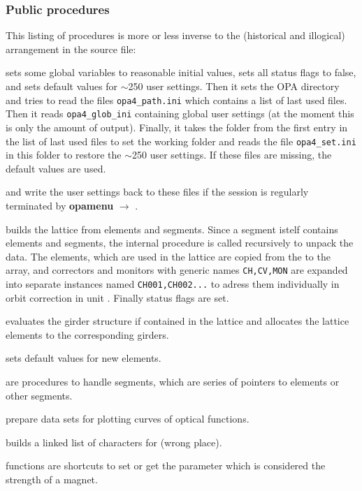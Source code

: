 \documentclass[12pt]{article}
\newcommand\code[1]{{\tt #1}}
\newcommand{\ofld}[1]{\colorbox{black!15}{{\bf #1}}}
\newcommand\guico[1]{{\color{blue}\code{#1}}}
\newcommand{\unico}[1]{{\color{burntorange}\code{#1}}}
\newcommand{\evcod}[2]{\ofld{#1} $\rightarrow$ \guico{#2}}
\newcommand{\opagui}[1]{\colorbox{blue!20}{{\color{black}\code{#1}}}}
\newcommand{\ogui}[1]{\hyperref[#1]{\opagui{#1}}}
\newcommand{\ppro}[1]{\subsubsection*{Public procedures} #1}
\newcommand{\todo}[1]{{\color{red} #1}}
\begin{document}
\ppro{
This listing of procedures is more or less inverse to the (historical and illogical) arrangement in the source file:

\unico{Initialization} sets some global variables to reasonable initial values, sets all status flags to false, and sets default values for $\sim$250 user settings.
Then it sets the OPA directory and tries to read the files \code{opa4\_path.ini} which contains a list of last used files. Then it reads \code{opa4\_glob\_ini} containing global user settings (at the moment this is only the amount of output). Finally, it takes the folder from the first entry in the list of last used files to set the working folder and reads the file \code{opa4\_set.ini} in this folder to restore the $\sim$250 user settings. If these files are missing, the default values are used.

\unico{GlobDefWriteFile} and \unico{DefWriteFile} write the user settings back to these files if the session is regularly terminated by \evcod{opamenu}{ExitOPA}.

\unico{MakeLattice} builds the lattice from elements and segments. Since a segment istelf contains elements and segments, the internal procedure \unico{SegLat} is called recursively to unpack the data. 
The elements, which are used in the lattice are copied from the \unico{Elem} to the \unico{Ella} array, and correctors and monitors with generic names \code{CH,CV,MON}
are expanded into separate instances named \code{CH001,CH002...} to adress them individually in orbit correction in unit \ogui{opaorbit}. Finally status flags are set.

\unico{GirderSetup} evaluates the girder structure if contained in the lattice and allocates the lattice elements to the corresponding girders.

\unico{IniElem} sets default values for new elements.

\unico{AppendAE, ClearSeg, NAESeg} are procedures to handle segments, which are series of pointers to elements or other segments.

\unico{AppendCurve, ClearCurve}  prepare data sets for plotting curves of optical functions. 

\unico{AppendChar} builds a linked list of characters for \ogui{opatexteditor} \todo{(wrong place)}.

\unico{putkval, getkval, putSexkval, getSexkval} functions are shortcuts to set or get the parameter which is considered the strength of a magnet.

}
\end{document}
